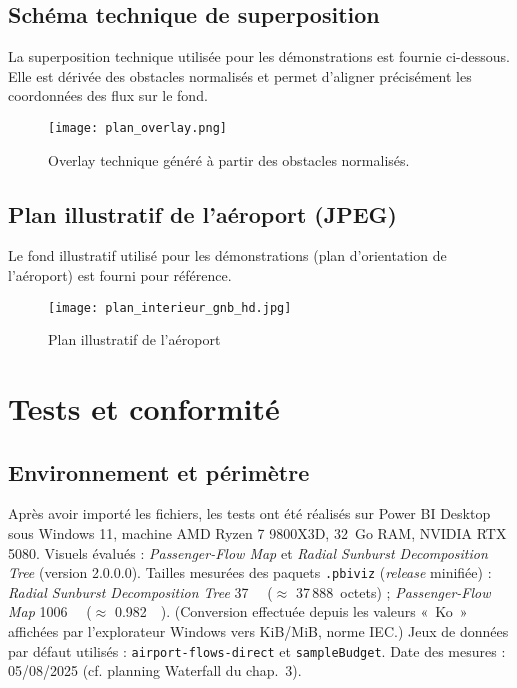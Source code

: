 \subsection{Schéma technique de superposition}
La superposition technique utilisée pour les démonstrations est fournie ci-dessous. 
Elle est dérivée des obstacles normalisés et permet d'aligner précisément les coordonnées des flux sur le fond.

\begin{figure}[h]
  \centering
  \texttt{[image: plan\_overlay.png]}
  \caption{Overlay technique généré à partir des obstacles normalisés.}
  \label{fig:a2-overlay}
\end{figure}

\subsection{Plan illustratif de l'aéroport (JPEG)}
Le fond illustratif utilisé pour les démonstrations (plan d’orientation de l’aéroport) est fourni pour référence.

\begin{figure}[h]
  \centering
  \texttt{[image: plan\_interieur\_gnb\_hd.jpg]}
  \caption{Plan illustratif de l'aéroport}
  \label{fig:a2-plan-jpeg}
\end{figure}

\section{Tests et conformité}
\label{ann:a3-tests}

\subsection{Environnement et périmètre}
Après avoir importé les fichiers, les tests ont été réalisés sur Power BI Desktop sous Windows 11, machine AMD Ryzen 7 9800X3D, 32~Go RAM, NVIDIA RTX 5080. 
Visuels évalués : \textit{Passenger-Flow Map} et \textit{Radial Sunburst Decomposition Tree} (version 2.0.0.0). 
Tailles mesurées des paquets \texttt{.pbiviz} (\textit{release} minifiée) : \textit{Radial Sunburst Decomposition Tree} \SI{37}{\kibi\byte} (\(\approx\) 37\,888~octets) ; \textit{Passenger-Flow Map} \SI{1006}{\kibi\byte} (\(\approx\) \SI{0.982}{\mebi\byte}). 
(Conversion effectuée depuis les valeurs «~Ko~» affichées par l’explorateur Windows vers KiB/MiB, norme IEC.) 
Jeux de données par défaut utilisés : \texttt{airport-flows-direct} et \texttt{sampleBudget}. 
Date des mesures : 05/08/2025 (cf. planning Waterfall du chap.~3).

